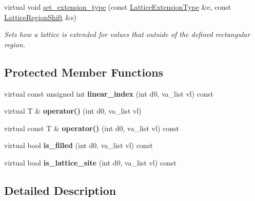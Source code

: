 \begin{DoxyCompactItemize}
\mbox{\label{classsisl_1_1cartesian__cubic_af25cab19b488abbfb22a86887c38ad06}} 
virtual void \hyperlink{classsisl_1_1cartesian__cubic_af25cab19b488abbfb22a86887c38ad06}{set\+\_\+extension\+\_\+type} (const \hyperlink{namespacesisl_aaf1f41d23ed37dacaa4c9f1bb6d3324f}{Lattice\+Extension\+Type} \&e, const \hyperlink{namespacesisl_af139f6f74488292ae48c0d71eaa5d4f1}{Lattice\+Region\+Shift} \&s)
\begin{DoxyCompactList}\small\item\em Sets how a lattice is extended for values that outside of the defined rectangular region. \end{DoxyCompactList}\end{DoxyCompactItemize}
\subsection*{Protected Member Functions}
\begin{DoxyCompactItemize}
\item 
\mbox{\label{classsisl_1_1cartesian__cubic_af5bf3656432d9da0559f50ed7607a562}} 
virtual const unsigned int {\bfseries linear\+\_\+index} (int d0, va\+\_\+list vl) const
\item 
\mbox{\label{classsisl_1_1cartesian__cubic_ab0035db1f1a2b045cbd99f060c158e3b}} 
virtual T \& {\bfseries operator()} (int d0, va\+\_\+list vl)
\item 
\mbox{\label{classsisl_1_1cartesian__cubic_a176f010635742f3fe75f406759f731a5}} 
virtual const T \& {\bfseries operator()} (int d0, va\+\_\+list vl) const
\item 
\mbox{\label{classsisl_1_1cartesian__cubic_a882271145d3a8d2be007545a19ec7f99}} 
virtual bool {\bfseries is\+\_\+filled} (int d0, va\+\_\+list vl) const
\item 
\mbox{\label{classsisl_1_1cartesian__cubic_a803ae897f35a41e98f15dc5391f53943}} 
virtual bool {\bfseries is\+\_\+lattice\+\_\+site} (int d0, va\+\_\+list vl) const
\end{DoxyCompactItemize}


\subsection{Detailed Description}

